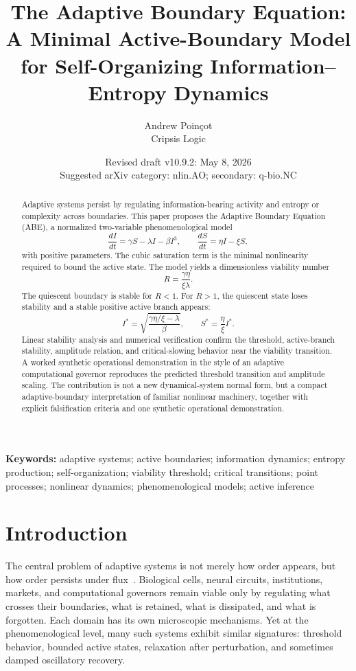 \documentclass[11pt]{article}
\title{\textbf{The Adaptive Boundary Equation:}\\
A Minimal Active-Boundary Model for Self-Organizing Information--Entropy Dynamics}
\author{Andrew Poinçot\\Cripsis Logic}
\date{Revised draft v10.9.2: May 8, 2026\\Suggested arXiv category: nlin.AO; secondary: q-bio.NC}
\begin{document}
\maketitle

\begin{abstract}
Adaptive systems persist by regulating information-bearing activity and entropy or complexity across boundaries. This paper proposes the Adaptive Boundary Equation (ABE), a normalized two-variable phenomenological model
\begin{equation*}
\frac{dI}{dt}=\gamma S-\lambda I-\beta I^3,\qquad
\frac{dS}{dt}=\eta I-\xi S,
\end{equation*}
with positive parameters. The cubic saturation term is the minimal nonlinearity required to bound the active state. The model yields a dimensionless viability number
\begin{equation*}
R=\frac{\gamma\eta}{\xi\lambda}.
\end{equation*}
The quiescent boundary is stable for $R<1$. For $R>1$, the quiescent state loses stability and a stable positive active branch appears:
\begin{equation*}
I^*=\sqrt{\frac{\gamma\eta/\xi-\lambda}{\beta}},\qquad S^*=\frac{\eta}{\xi}I^*.
\end{equation*}
Linear stability analysis and numerical verification confirm the threshold, active-branch stability, amplitude relation, and critical-slowing behavior near the viability transition. A worked synthetic operational demonstration in the style of an adaptive computational governor reproduces the predicted threshold transition and amplitude scaling. The contribution is not a new dynamical-system normal form, but a compact adaptive-boundary interpretation of familiar nonlinear machinery, together with explicit falsification criteria and one synthetic operational demonstration.
\end{abstract}

\noindent\textbf{Keywords:} adaptive systems; active boundaries; information dynamics; entropy production; self-organization; viability threshold; critical transitions; point processes; nonlinear dynamics; phenomenological models; active inference

\clearpage
\section{Introduction}
The central problem of adaptive systems is not merely how order appears, but how order persists under flux~\cite{schrodinger1944life}. Biological cells, neural circuits, institutions, markets, and computational governors remain viable only by regulating what crosses their boundaries, what is retained, what is dissipated, and what is forgotten. Each domain has its own microscopic mechanisms. Yet at the phenomenological level, many such systems exhibit similar signatures: threshold behavior, bounded active states, relaxation after perturbation, and sometimes damped oscillatory recovery.
\end{document}
